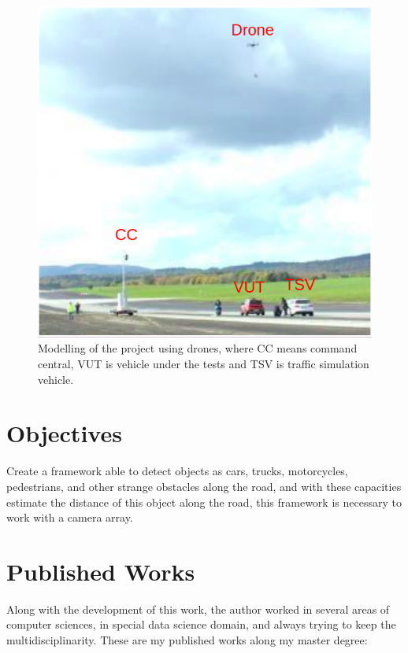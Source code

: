 \begin{figure}[H]
\centering
\includegraphics[scale=0.6]{imagens/proposal.png}
\caption{Modelling of the project using drones, where CC means command central, VUT is vehicle under the tests and TSV is traffic simulation vehicle.}
\label{fig:tests}
\end{figure}

\section{Objectives}

Create a framework able to detect objects as cars, trucks, motorcycles, pedestrians, and other strange obstacles along the road, and with these capacities estimate the distance of this object along the road, this framework is necessary to work with a camera array.

\section{Published Works}

Along with the development of this work, the author worked in several areas of computer sciences, in special data science domain, and always trying to keep the multidisciplinarity. These are my published works along my master degree:

